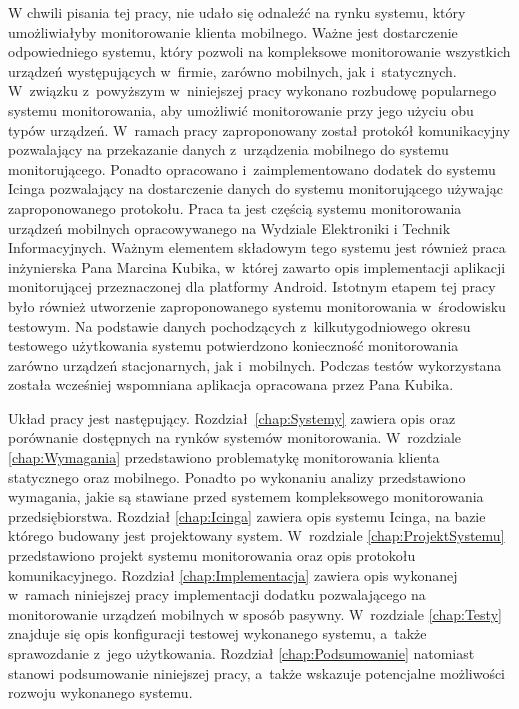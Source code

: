 W chwili pisania tej pracy, nie udało się odnaleźć na rynku systemu,
który umożliwiałyby monitorowanie klienta mobilnego. Ważne jest
dostarczenie odpowiedniego systemu, który pozwoli na kompleksowe
monitorowanie wszystkich urządzeń występujących w~firmie, zarówno
mobilnych, jak i~statycznych. W~związku z~powyższym w~niniejszej pracy
wykonano rozbudowę popularnego systemu monitorowania, aby umożliwić
monitorowanie przy jego użyciu obu typów urządzeń. W~ramach pracy
zaproponowany został protokół komunikacyjny pozwalający na przekazanie
danych z~urządzenia mobilnego do systemu monitorującego. Ponadto
opracowano i~zaimplementowano dodatek do systemu Icinga pozwalający na
dostarczenie danych do systemu monitorującego używając zaproponowanego
protokołu. Praca ta jest częścią systemu monitorowania urządzeń
mobilnych opracowywanego na Wydziale Elektroniki i Technik
Informacyjnych. Ważnym elementem składowym tego systemu jest również
praca inżynierska Pana Marcina Kubika\cite{book:pracaKubika}, w~której
zawarto opis implementacji aplikacji monitorującej przeznaczonej dla
platformy Android. Istotnym etapem tej pracy było również utworzenie
zaproponowanego systemu monitorowania w~środowisku testowym. Na
podstawie danych pochodzących z~kilkutygodniowego okresu testowego
użytkowania systemu potwierdzono konieczność monitorowania zarówno
urządzeń stacjonarnych, jak i~mobilnych. Podczas testów wykorzystana
została wcześniej wspomniana aplikacja opracowana przez Pana Kubika.

Układ pracy jest następujący. Rozdział~\ref{chap:Systemy} zawiera opis
oraz porównanie dostępnych na rynków systemów
monitorowania. W~rozdziale \ref{chap:Wymagania} przedstawiono
problematykę monitorowania klienta statycznego oraz mobilnego. Ponadto
po wykonaniu analizy przedstawiono wymagania, jakie są stawiane przed
systemem kompleksowego monitorowania przedsiębiorstwa. Rozdział
\ref{chap:Icinga} zawiera opis systemu Icinga, na bazie którego
budowany jest projektowany system. W~rozdziale
\ref{chap:ProjektSystemu} przedstawiono projekt systemu monitorowania
oraz opis protokołu komunikacyjnego. Rozdział \ref{chap:Implementacja}
zawiera opis wykonanej w~ramach niniejszej pracy implementacji dodatku
pozwalającego na monitorowanie urządzeń mobilnych w sposób
pasywny. W~rozdziale \ref{chap:Testy} znajduje się opis konfiguracji
testowej wykonanego systemu, a~także sprawozdanie z~jego
użytkowania. Rozdział \ref{chap:Podsumowanie} natomiast stanowi
podsumowanie niniejszej pracy, a~także wskazuje potencjalne możliwości
rozwoju wykonanego systemu.
